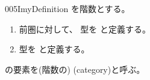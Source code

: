 \documentclass[index]{subfiles}
\begin{document}
\begin{myBlock}{005I}{myDefinition}
  を階数とする。
  \begin{enumerate}
  \item 前圏に対して、
    型を
    と定義する。
  \item 型を
    と定義する。
  \end{enumerate}
  の要素を(階数の)
  (category)と呼ぶ。
\end{myBlock}
\end{document}
